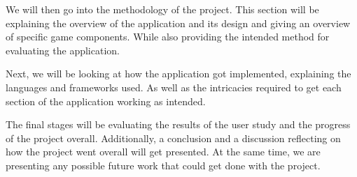 		We will then go into the methodology of the project. This section will be explaining the overview of the application and its design and giving an overview of specific game components. While also providing the intended method for evaluating the application.
		
		Next, we will be looking at how the application got implemented, explaining the languages and frameworks used. As well as the intricacies required to get each section of the application working as intended. 
		
		The final stages will be evaluating the results of the user study and the progress of the project overall. Additionally, a conclusion and a discussion reflecting on how the project went overall will get presented. At the same time, we are presenting any possible future work that could get done with the project.
	
	